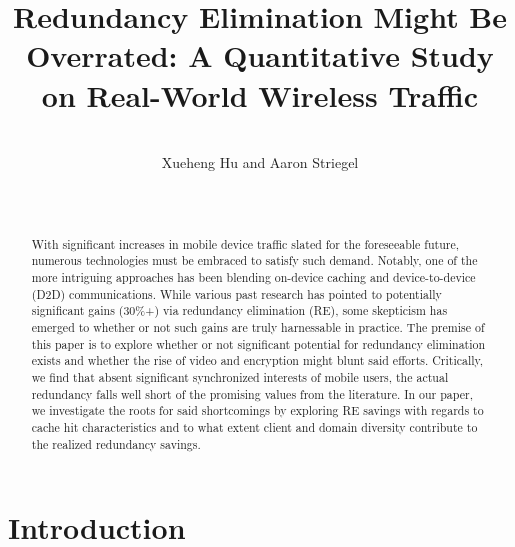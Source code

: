 \documentclass{sig-alternate}
\begin{document}
\title{Redundancy Elimination Might Be Overrated: A Quantitative Study on Real-World Wireless Traffic}



\author{ \\
\alignauthor Xueheng Hu and Aaron Striegel \\
        \\
        \\
}





\maketitle

\begin{abstract}
With significant increases in mobile device traffic slated for the foreseeable future, numerous technologies must be embraced to satisfy such demand.  Notably, one of the more intriguing approaches has been blending on-device caching and device-to-device (D2D) communications.  While various past research has pointed to potentially significant gains (30\%+) via redundancy elimination (RE), some skepticism has emerged to whether or not such gains are truly harnessable in practice.  The premise of this paper is to explore whether or not significant potential for redundancy elimination exists and whether the rise of video and encryption might blunt said efforts.  Critically, we find that absent significant synchronized interests of mobile users, the actual redundancy falls well short of the promising values from the literature.  In our paper, we investigate the roots for said shortcomings by exploring RE savings with regards to cache hit characteristics and to what extent client and domain diversity contribute to the realized redundancy savings.   
\end{abstract}



\section{Introduction}
\end{document}
